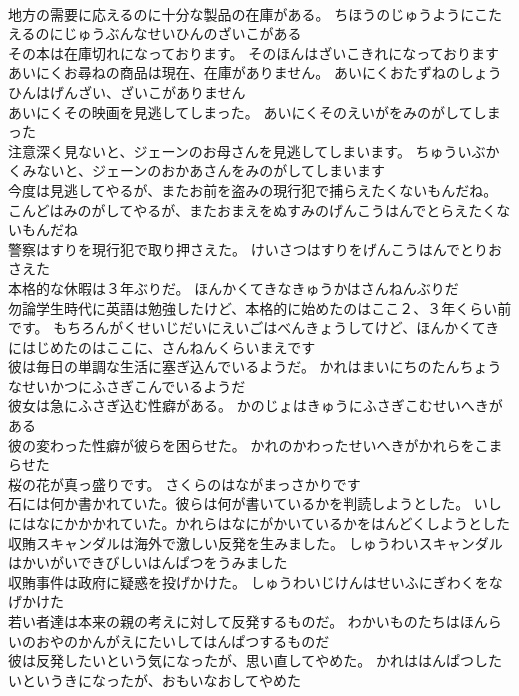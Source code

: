 \documentclass[8pt]{extreport}
\begin{document}
\begin{CJK}{UTF8}{min}
\\	地方の需要に応えるのに十分な製品の在庫がある。	ちほうのじゅうようにこたえるのにじゅうぶんなせいひんのざいこがある 
\\	その本は在庫切れになっております。	そのほんはざいこきれになっております 
\\	あいにくお尋ねの商品は現在、在庫がありません。	あいにくおたずねのしょうひんはげんざい、ざいこがありません 
\\	あいにくその映画を見逃してしまった。	あいにくそのえいがをみのがしてしまった 
\\	注意深く見ないと、ジェーンのお母さんを見逃してしまいます。	ちゅういぶかくみないと、ジェーンのおかあさんをみのがしてしまいます 
\\	今度は見逃してやるが、またお前を盗みの現行犯で捕らえたくないもんだね。	こんどはみのがしてやるが、またおまえをぬすみのげんこうはんでとらえたくないもんだね 
\\	警察はすりを現行犯で取り押さえた。	けいさつはすりをげんこうはんでとりおさえた 
\\	本格的な休暇は３年ぶりだ。	ほんかくてきなきゅうかはさんねんぶりだ 
\\	勿論学生時代に英語は勉強したけど、本格的に始めたのはここ２、３年くらい前です。	もちろんがくせいじだいにえいごはべんきょうしてけど、ほんかくてきにはじめたのはここに、さんねんくらいまえです 
\\	彼は毎日の単調な生活に塞ぎ込んでいるようだ。	かれはまいにちのたんちょうなせいかつにふさぎこんでいるようだ 
\\	彼女は急にふさぎ込む性癖がある。	かのじょはきゅうにふさぎこむせいへきがある 
\\	彼の変わった性癖が彼らを困らせた。	かれのかわったせいへきがかれらをこまらせた 
\\	桜の花が真っ盛りです。	さくらのはながまっさかりです 
\\	石には何か書かれていた。彼らは何が書いているかを判読しようとした。	いしにはなにかかかれていた。かれらはなにがかいているかをはんどくしようとした 
\\	収賄スキャンダルは海外で激しい反発を生みました。	しゅうわいスキャンダルはかいがいできびしいはんぱつをうみました 
\\	収賄事件は政府に疑惑を投げかけた。	しゅうわいじけんはせいふにぎわくをなげかけた 
\\	若い者達は本来の親の考えに対して反発するものだ。	わかいものたちはほんらいのおやのかんがえにたいしてはんぱつするものだ 
\\	彼は反発したいという気になったが、思い直してやめた。	かれははんぱつしたいというきになったが、おもいなおしてやめた 

\end{CJK}
\end{document}
